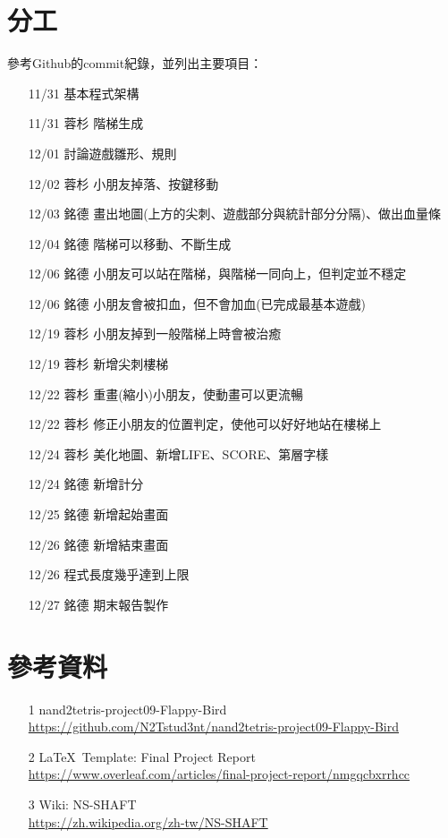 \documentclass[12pt,a4paper]{article}
\begin{document}
\section{分工}
參考Github的commit紀錄，並列出主要項目：
\begin{itemize}
    \setlength{\parsep}{-1em}
    \setlength{\parskip}{0em}
    \setlength{\itemsep}{-4pt}
    \addtolength{\itemindent}{4em}
    \item[11/31 　　] 基本程式架構
    \item[11/31 蓉杉] 階梯生成
    \item[12/01 　　] 討論遊戲雛形、規則
    \item[12/02 蓉杉] 小朋友掉落、按鍵移動
    \item[12/03 銘德] 畫出地圖(上方的尖刺、遊戲部分與統計部分分隔)、做出血量條
    \item[12/04 銘德] 階梯可以移動、不斷生成
    \item[12/06 銘德] 小朋友可以站在階梯，與階梯一同向上，但判定並不穩定
    \item[12/06 銘德] 小朋友會被扣血，但不會加血(已完成最基本遊戲)
    \item[12/19 蓉杉] 小朋友掉到一般階梯上時會被治癒
    \item[12/19 蓉杉] 新增尖刺樓梯
    \item[12/22 蓉杉] 重畫(縮小)小朋友，使動畫可以更流暢
    \item[12/22 蓉杉] 修正小朋友的位置判定，使他可以好好地站在樓梯上
    \item[12/24 蓉杉] 美化地圖、新增LIFE、SCORE、第層字樣
    \item[12/24 銘德] 新增計分
    \item[12/25 銘德] 新增起始畫面
    \item[12/26 銘德] 新增結束畫面
    \item[12/26 　　] 程式長度幾乎達到上限
    \item[12/27 銘德] 期末報告製作
\end{itemize}

\section{參考資料}
\begin{itemize}
\item[1] nand2tetris-project09-Flappy-Bird\\ \url{https://github.com/N2Tstud3nt/nand2tetris-project09-Flappy-Bird}
\item[2] \LaTeX ~Template: Final Project Report\\ \url{https://www.overleaf.com/articles/final-project-report/nmgqcbxrrhcc}
\item[3] Wiki: NS-SHAFT\\
\url{https://zh.wikipedia.org/zh-tw/NS-SHAFT}
\end{itemize}

\end{document}
